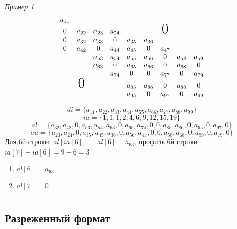 \documentclass[oneside]{book}
\theoremstyle{plain}
\theoremstyle{remark}
\newtheorem*{examp}{Пример}
\theoremstyle{definition}
\begin{document}
\begin{examp}
\-
\[ \begin{matrix}
a_{11} & & & & & & & & \\
0 & a_{22} & a_{23} & a_{24} & & &  \text{\huge0}& &  \\
0 & a_{32} & a_{33} & 0 & a_{35} & a_{36} & & &  \\
0 & a_{42} & 0 & a_{44} & a_{45} & 0 & a_{47} & &  \\
& & a_{53} & a_{54} & a_{55} & a_{56} & 0 & a_{58} & a_{59} \\
& & a_{63} & 0 & a_{65} & a_{66} & 0 & a_{68} & 0 \\
& & & a_{74} & 0 & 0 & a_{77} & 0 & a_{79} \\
& \text{\huge0}& &  & a_{85} & a_{86} & 0 & a_{88} & 0 \\
& & &  & a_{95} & 0 & a_{97} & 0 & a_{99}
\end{matrix} \]

\[ di = \{a_{11}, a_{22}, a_{33}, a_{44}, a_{55}, a_{66}, a_{77}, a_{88}, a_{99}\} \]
\[ ia = \{1, 1, 1, 2, 4, 6, 9, 12, 15, 19\} \]
\[ al = \{a_{32}, a_{42}, 0, a_{53}, a_{54}, a_{63}, 0, a_{65}, a_{74}, 0, 0, a_{85}, a_{86}, 0, a_{95}, 0, a_{97}, 0\} \]
\[ au = \{a_{23}, a_{24}, 0, a_{35}, a_{45}, a_{36}, 0, a_{56}, a_{47}, 0, 0, a_{58}, a_{68}, 0, a_{59}, 0, a_{79}, 0\} \]
Для 6й строки: \(al[ia[6]] = al[6] = a_{63}\), профиль 6й строки \(ia[7] - ia[6] = 9 - 6 = 3\)
\begin{enumerate}
\item \(al[6] = a_{63}\)
\item \(al[7] = 0\)
\end{enumerate}
\end{examp}
\chapter{}
\label{sec:orgbe50d6d}
\section{Разреженный формат}
\label{sec:org0b56101}
\end{document}
